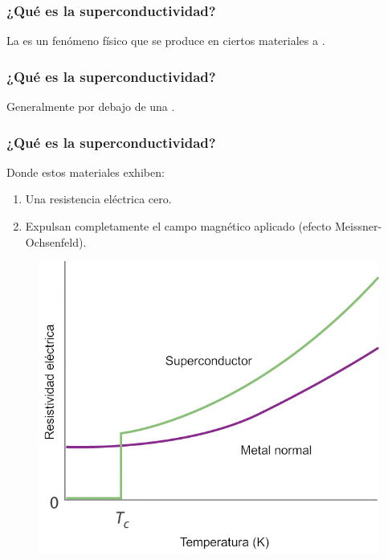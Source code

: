 \documentclass[14pt]{beamer}
\begin{document}
\begin{frame}
\frametitle{¿Qué es la superconductividad?}
La  es un fenómeno físico que se produce en ciertos materiales a .
\end{frame}
\begin{frame}
\frametitle{¿Qué es la superconductividad?}
Generalmente por debajo de una .
\end{frame}
\begin{frame}
\frametitle{¿Qué es la superconductividad?}
Donde estos materiales exhiben:
\pause
{}
\begin{enumerate}[<+->]
\item Una resistencia eléctrica cero.
\item Expulsan completamente el campo magnético aplicado (efecto Meissner-Ochsenfeld).
\end{enumerate}
\end{frame}
\begin{frame}
\vspace*{-1cm}
\begin{figure}
    \centering
    \includegraphics[scale=1.5]{Imagenes/Superconductividad_01.jpg}
\end{figure}
\end{frame}
\end{document}

